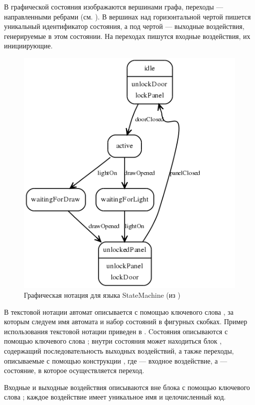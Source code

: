 В графической состояния изображаются вершинами графа, переходы --- направленными ребрами (см. ). В вершинах над горизонтальной чертой пишется уникальный идентификатор состояния, а под чертой --- выходные воздействия, генерируемые в этом состоянии. На переходах пишутся входные воздействия, их инициирующие.

\begin{figure}[htbp]
	\centering
	\includegraphics[scale=.5]{smgraph.png}
	\caption{Графическая нотация для языка StateMachine (из \cite{StateMachine})}\label{SM}
\end{figure}

В текстовой нотации автомат описывается с помощью ключевого слова , за которым следуем имя автомата и набор состояний в фигурных скобках. Пример использования текстовой нотации приведен в . Cостояния описываются с помощью ключевого слова ; внутри состояния может находиться блок , содержащий последовательность выходных воздействий, а также переходы, описываемые с помощью конструкции , где  --- входное воздействие, а  --- состояние, в которое осуществляется переход.

Входные и выходные воздействия описываются вне блока  с помощью ключевого слова ; каждое воздействие имеет уникальное имя и целочисленный код.

